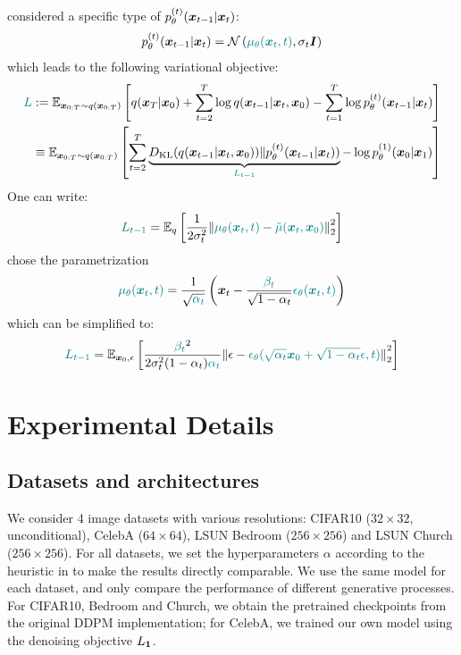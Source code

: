\citet{ho2020denoising} considered a specific type of $p_\theta^{(t)}({\bm{x}}_{t-1} | {\bm{x}}_t)$:
\begin{align}
    p_\theta^{(t)}({\bm{x}}_{t-1} | {\bm{x}}_t) = {\mathcal{N}}\left({\color{teal} \mu_\theta({\bm{x}}_t, t)}, \sigma_t {\bm{I}}\right)
\end{align}
which leads to the following variational objective:
\begin{align}
   {\color{teal} L} & := {\mathbb{E}}_{{\bm{x}}_{0:T} \sim q({\bm{x}}_{0:T})} \left[q({\bm{x}}_T | {\bm{x}}_0) + \sum_{t=2}^{T} \log q({\bm{x}}_{t-1} | {\bm{x}}_t, {\bm{x}}_0) - \sum_{t=1}^{T} \log p_\theta^{(t)}({\bm{x}}_{t-1} | {\bm{x}}_t) \right] \\
   & \equiv {\mathbb{E}}_{{\bm{x}}_{0:T} \sim q({\bm{x}}_{0:T})} \left[\sum_{t=2}^{T} \underbrace{D_{\mathrm{KL}}(q({\bm{x}}_{t-1} | {\bm{x}}_t, {\bm{x}}_0)) \Vert p_\theta^{(t)}({\bm{x}}_{t-1} | {\bm{x}}_t))}_{\color{teal} L_{t-1}} - \log p_\theta^{(1)}({\bm{x}}_0 | {\bm{x}}_1) \right] \nonumber
\end{align}
One can write:
\begin{align}
    {\color{teal} L_{t-1}} = {\mathbb{E}}_q\left[\frac{1}{2\sigma_t^2} {\lVert {{\color{teal} \mu_\theta({\bm{x}}_t, t)} - {\color{teal} \tilde{\mu}({\bm{x}}_t, {\bm{x}}_0)}} \rVert}_2^2\right]
\end{align}
\citet{ho2020denoising} chose the parametrization
\begin{align}
    {\color{teal} \mu_\theta({\bm{x}}_t, t)} = \frac{1}{\sqrt{{\color{teal} \alpha_t}}} \left({\bm{x}}_t - \frac{{\color{teal} \beta_t}}{\sqrt{1 - \alpha_t}} {\color{teal} \epsilon_\theta({\bm{x}}_t, t)}\right)
\end{align}
which can be simplified to:
\begin{align}
    {\color{teal} L_{t-1}} = {\mathbb{E}}_{{\bm{x}}_0, \epsilon}\left[\frac{{\color{teal} \beta_t}^2}{2\sigma_t^2 (1 - \alpha_t) {\color{teal} \alpha_t}} {\lVert {\epsilon - {\color{teal} \epsilon_\theta(\sqrt{\alpha_t} {\bm{x}}_0 + \sqrt{1 - \alpha_t} \epsilon, t)}} \rVert}_2^2\right]
\end{align}




\section{Experimental Details}
\label{app:exp}
\subsection{Datasets and architectures}
We consider 4 image datasets with various resolutions: CIFAR10 ($32 \times 32$, unconditional), CelebA ($64 \times 64$), LSUN Bedroom ($256 \times 256$) and LSUN Church ($256 \times 256$). For all datasets, we set the hyperparameters $\alpha$ according to the heuristic in \citep{ho2020denoising} to make the results directly comparable. We use the same model for each dataset, and only compare the performance of different generative processes. For CIFAR10, Bedroom and Church, we obtain the pretrained checkpoints from the original DDPM implementation; for CelebA, we trained our own model using the denoising objective $L_{\bm{1}}$.


